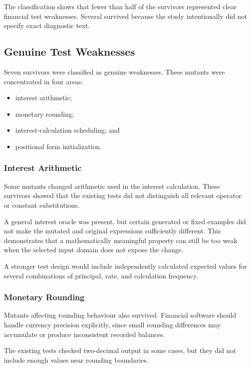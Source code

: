 \documentclass[12pt]{article}
\begin{document}
The classification shows that fewer than half of the survivors represented
clear financial test weaknesses. Several survived because the study
intentionally did not specify exact diagnostic text.

\subsection{Genuine Test Weaknesses}

Seven survivors were classified as genuine weaknesses. These mutants were
concentrated in four areas:

\begin{itemize}
    \item interest arithmetic;
    \item monetary rounding;
    \item interest-calculation scheduling; and
    \item positional form initialization.
\end{itemize}

\subsubsection{Interest Arithmetic}

Some mutants changed arithmetic used in the interest calculation. These
survivors showed that the existing tests did not distinguish all relevant
operator or constant substitutions.

A general interest oracle was present, but certain generated or fixed examples
did not make the mutated and original expressions sufficiently different.
This demonstrates that a mathematically meaningful property can still be too
weak when the selected input domain does not expose the change.

A stronger test design would include independently calculated expected values
for several combinations of principal, rate, and calculation frequency.

\subsubsection{Monetary Rounding}

Mutants affecting rounding behaviour also survived. Financial software should
handle currency precision explicitly, since small rounding differences may
accumulate or produce inconsistent recorded balances.

The existing tests checked two-decimal output in some cases, but they did not
include enough values near rounding boundaries.
\end{document}
